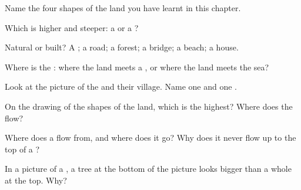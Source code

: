 \begin{exercise}[$\star$]\label{exo:g1:landscapes-around-us:1}
Name the four shapes of the land you have learnt in this chapter.
\end{exercise}

\begin{exercise}[$\star$]\label{exo:g1:landscapes-around-us:2}
Which is higher and steeper: a  or a ?
\end{exercise}

\begin{exercise}[$\star$]\label{exo:g1:landscapes-around-us:3}
Natural or built? A ; a road; a forest; a bridge; a beach; a house.
\end{exercise}

\begin{exercise}[$\star$]\label{exo:g1:landscapes-around-us:4}
Where is the : where the land meets a , or where the land meets
the sea?
\end{exercise}

\begin{exercise}[$\star$]\label{exo:g1:landscapes-around-us:5}
Look at the picture of the  and their village. Name one  and one .
\end{exercise}

\begin{exercise}[$\star$]\label{exo:g1:landscapes-around-us:6}
On the drawing of the shapes of the land, which  is the highest?
Where does the  flow?
\end{exercise}

\begin{exercise}[$\star\star$]\label{exo:g1:landscapes-around-us:7}
Where does a  flow from, and where does it go? Why does it never flow
up to the top of a ?
\end{exercise}

\begin{exercise}[$\star\star$]\label{exo:g1:landscapes-around-us:8}
In a picture of a , a tree at the bottom of the picture looks
bigger than a whole  at the top. Why?
\end{exercise}


